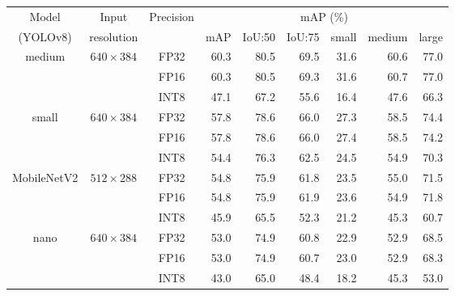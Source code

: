 \begin{appendices}
\begin{table}[t]
    \centering
    \small
    \begin{threeparttable}
        \begin{tabular}{|c|c|c|rrrrrr|}
            \hline
            Model & Input & \multirow{2}{*}{Precision} &  \multicolumn{6}{c|}{mAP (\%)} \\
            \cline{4-9}
            (YOLOv8)                     & resolution                      &      & mAP   & IoU:50& IoU:75& small & medium& large \\
            \hline
            \hline
            \multirow{3}{*}{medium}     & \multirow{3}{*}{$640\times384$}  & FP32 & 60.3 & 80.5 & 69.5 & 31.6 & 60.6 & 77.0 \\
                                        &                                  & FP16 & 60.3 & 80.5 & 69.3 & 31.6 & 60.7 & 77.0 \\
                                        &                                  & INT8 & 47.1 & 67.2 & 55.6 & 16.4 & 47.6 & 66.3 \\
            \hline                                                           
            \multirow{3}{*}{small}      & \multirow{3}{*}{$640\times384$}  & FP32 & 57.8 & 78.6 & 66.0 & 27.3 & 58.5 & 74.4 \\
                                        &                                  & FP16 & 57.8 & 78.6 & 66.0 & 27.4 & 58.5 & 74.2 \\
                                        &                                  & INT8 & 54.4 & 76.3 & 62.5 & 24.5 & 54.9 & 70.3 \\
            \hline
            \multirow{3}{*}{MobileNetV2}& \multirow{3}{*}{$512\times288$}  & FP32 & 54.8 & 75.9 & 61.8 & 23.5 & 55.0 & 71.5 \\
                                        &                                  & FP16 & 54.8 & 75.9 & 61.9 & 23.6 & 54.9 & 71.8 \\
                                        &                                  & INT8 & 45.9 & 65.5 & 52.3 & 21.2 & 45.3 & 60.7 \\
            \hline                      
            \multirow{9}{*}{nano}       & \multirow{3}{*}{$640\times384$}  & FP32 & 53.0 & 74.9 & 60.8 & 22.9 & 52.9 & 68.5 \\
                                        &                                  & FP16 & 53.0 & 74.9 & 60.7 & 23.0 & 52.9 & 68.3 \\
                                        &                                  & INT8 & 43.0 & 65.0 & 48.4 & 18.2 & 45.3 & 53.0 \\

\end{tabular}
\end{threeparttable}
\end{table}
\end{appendices}
